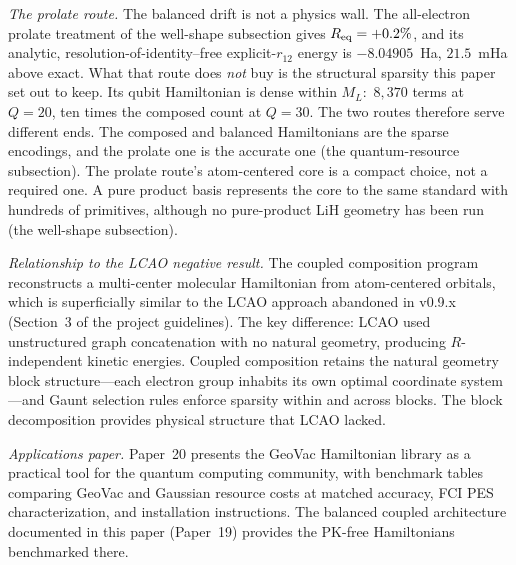 \documentclass[aps,pra,twocolumn,superscriptaddress,longbibliography]{revtex4-2}
\begin{document}
\emph{The prolate route.}  The balanced drift is not a physics wall.  The
all-electron prolate treatment of the well-shape subsection gives
$R_{\rm eq}=+0.2\%$, and its analytic, resolution-of-identity--free
explicit-$r_{12}$ energy is $-8.04905$~Ha, $21.5$~mHa above exact.  What that
route does \emph{not} buy is the structural sparsity this paper set out to keep.
Its qubit Hamiltonian is dense within $M_L$:\ $8{,}370$ terms at $Q=20$, ten
times the composed count at $Q=30$.  The two routes therefore serve different
ends.  The composed and balanced Hamiltonians are the sparse encodings, and the
prolate one is the accurate one (the quantum-resource subsection).  The
prolate route's atom-centered core is a compact choice, not a required one.  A
pure product basis represents the core to the same standard with hundreds of
primitives, although no pure-product LiH geometry has been run (the well-shape
subsection).

\emph{Relationship to the LCAO negative result.}  The coupled
composition program reconstructs a multi-center molecular Hamiltonian
from atom-centered orbitals, which is superficially similar to the
LCAO approach abandoned in v0.9.x (Section~3 of the project
guidelines).  The key difference: LCAO used unstructured graph
concatenation with no natural geometry, producing $R$-independent
kinetic energies.  Coupled composition retains the natural geometry
block structure---each electron group inhabits its own optimal
coordinate system---and Gaunt selection rules enforce sparsity within
and across blocks.  The block decomposition provides physical
structure that LCAO lacked.

\emph{Applications paper.}  Paper~20 presents the GeoVac Hamiltonian
library as a practical tool for the quantum computing community, with
benchmark tables comparing GeoVac and Gaussian resource costs at
matched accuracy, FCI PES characterization, and installation
instructions.  The balanced coupled architecture documented in this
paper (Paper~19) provides the PK-free Hamiltonians benchmarked there.


\end{document}
